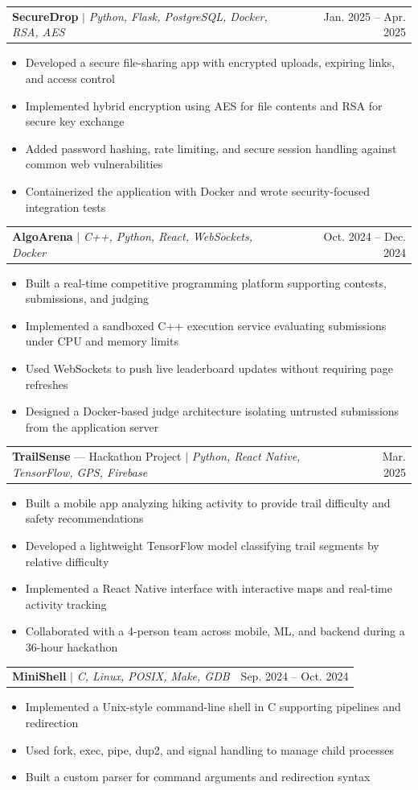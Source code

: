 \documentclass[letterpaper,11pt]{article}
\makeatletter
\newcommand{\resumeItem}[1]{
  \item\small{
    {#1 \vspace{-2pt}}
  }
}
\newcommand{\resumeProjectHeading}[2]{
    \item
    \begin{tabular*}{\textwidth}{l@{\extracolsep{\fill}}r}
      \small#1 & #2 \\
    \end{tabular*}\vspace{-7pt}
}
\newcommand{\resumeItemListStart}{\begin{itemize}[leftmargin=0.2in]}
\newcommand{\resumeItemListEnd}{\end{itemize}\vspace{-5pt}}
\makeatother
\begin{document}
      \resumeProjectHeading
          {\textbf{SecureDrop} $|$ \emph{Python, Flask, PostgreSQL, Docker, RSA, AES}}{Jan. 2025 -- Apr. 2025}
          \resumeItemListStart
            \resumeItem{Developed a secure file-sharing app with encrypted uploads, expiring links, and access control}
            \resumeItem{Implemented hybrid encryption using AES for file contents and RSA for secure key exchange}
            \resumeItem{Added password hashing, rate limiting, and secure session handling against common web vulnerabilities}
            \resumeItem{Containerized the application with Docker and wrote security-focused integration tests}
          \resumeItemListEnd

      \resumeProjectHeading
          {\textbf{AlgoArena} $|$ \emph{C++, Python, React, WebSockets, Docker}}{Oct. 2024 -- Dec. 2024}
          \resumeItemListStart
            \resumeItem{Built a real-time competitive programming platform supporting contests, submissions, and judging}
            \resumeItem{Implemented a sandboxed C++ execution service evaluating submissions under CPU and memory limits}
            \resumeItem{Used WebSockets to push live leaderboard updates without requiring page refreshes}
            \resumeItem{Designed a Docker-based judge architecture isolating untrusted submissions from the application server}
          \resumeItemListEnd

      \resumeProjectHeading
          {\textbf{TrailSense} --- Hackathon Project $|$ \emph{Python, React Native, TensorFlow, GPS, Firebase}}{Mar. 2025}
          \resumeItemListStart
            \resumeItem{Built a mobile app analyzing hiking activity to provide trail difficulty and safety recommendations}
            \resumeItem{Developed a lightweight TensorFlow model classifying trail segments by relative difficulty}
            \resumeItem{Implemented a React Native interface with interactive maps and real-time activity tracking}
            \resumeItem{Collaborated with a 4-person team across mobile, ML, and backend during a 36-hour hackathon}
          \resumeItemListEnd

      \resumeProjectHeading
          {\textbf{MiniShell} $|$ \emph{C, Linux, POSIX, Make, GDB}}{Sep. 2024 -- Oct. 2024}
          \resumeItemListStart
            \resumeItem{Implemented a Unix-style command-line shell in C supporting pipelines and redirection}
            \resumeItem{Used fork, exec, pipe, dup2, and signal handling to manage child processes}
            \resumeItem{Built a custom parser for command arguments and redirection syntax}
          \resumeItemListEnd
\end{document}
